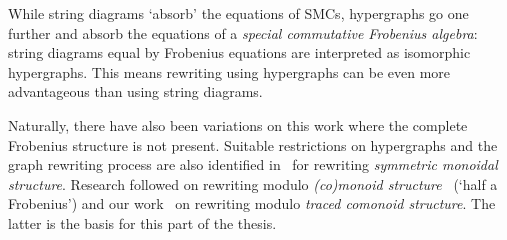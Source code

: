 While string diagrams `absorb' the equations of SMCs, hypergraphs go one further
and absorb the equations of
a \emph{special commutative Frobenius algebra}: string diagrams
equal by Frobenius equations are interpreted as isomorphic hypergraphs.
This means rewriting using hypergraphs can be even more
advantageous than using string diagrams.

Naturally, there have also been variations on this work where the complete
Frobenius structure is not present.
Suitable restrictions on hypergraphs and the graph rewriting process are also
identified in~\cite{bonchi2016rewriting} for rewriting
\emph{symmetric monoidal structure}.
Research followed on rewriting modulo
\emph{(co)monoid structure}~\cite{milosavljevic2023string} (`half a Frobenius')
and our work~\cite{ghica2023rewriting} on rewriting modulo
\emph{traced comonoid structure}.
The latter is the basis for this part of the thesis.